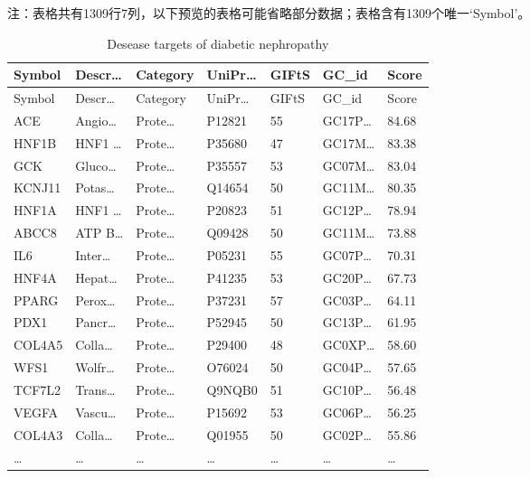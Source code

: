 \documentclass[
]{article}
\begin{document}
\begin{center}\begin{tcolorbox}[colback=gray!10, colframe=gray!50, width=0.9\linewidth, arc=1mm, boxrule=0.5pt]注：表格共有1309行7列，以下预览的表格可能省略部分数据；表格含有1309个唯一`Symbol'。
\end{tcolorbox}
\end{center}

\begin{longtable}[]{@{}lllllll@{}}
\caption{\label{tab:desease-targets-of-diabetic-nephropathy}Desease targets of diabetic nephropathy}\tabularnewline
\toprule\noalign{}
Symbol & Descr\ldots{} & Category & UniPr\ldots{} & GIFtS & GC\_id & Score \\
\midrule\noalign{}
\endfirsthead
\toprule\noalign{}
Symbol & Descr\ldots{} & Category & UniPr\ldots{} & GIFtS & GC\_id & Score \\
\midrule\noalign{}
\endhead
\bottomrule\noalign{}
\endlastfoot
ACE & Angio\ldots{} & Prote\ldots{} & P12821 & 55 & GC17P\ldots{} & 84.68 \\
HNF1B & HNF1 \ldots{} & Prote\ldots{} & P35680 & 47 & GC17M\ldots{} & 83.38 \\
GCK & Gluco\ldots{} & Prote\ldots{} & P35557 & 53 & GC07M\ldots{} & 83.04 \\
KCNJ11 & Potas\ldots{} & Prote\ldots{} & Q14654 & 50 & GC11M\ldots{} & 80.35 \\
HNF1A & HNF1 \ldots{} & Prote\ldots{} & P20823 & 51 & GC12P\ldots{} & 78.94 \\
ABCC8 & ATP B\ldots{} & Prote\ldots{} & Q09428 & 50 & GC11M\ldots{} & 73.88 \\
IL6 & Inter\ldots{} & Prote\ldots{} & P05231 & 55 & GC07P\ldots{} & 70.31 \\
HNF4A & Hepat\ldots{} & Prote\ldots{} & P41235 & 53 & GC20P\ldots{} & 67.73 \\
PPARG & Perox\ldots{} & Prote\ldots{} & P37231 & 57 & GC03P\ldots{} & 64.11 \\
PDX1 & Pancr\ldots{} & Prote\ldots{} & P52945 & 50 & GC13P\ldots{} & 61.95 \\
COL4A5 & Colla\ldots{} & Prote\ldots{} & P29400 & 48 & GC0XP\ldots{} & 58.60 \\
WFS1 & Wolfr\ldots{} & Prote\ldots{} & O76024 & 50 & GC04P\ldots{} & 57.65 \\
TCF7L2 & Trans\ldots{} & Prote\ldots{} & Q9NQB0 & 51 & GC10P\ldots{} & 56.48 \\
VEGFA & Vascu\ldots{} & Prote\ldots{} & P15692 & 53 & GC06P\ldots{} & 56.25 \\
COL4A3 & Colla\ldots{} & Prote\ldots{} & Q01955 & 50 & GC02P\ldots{} & 55.86 \\
\ldots{} & \ldots{} & \ldots{} & \ldots{} & \ldots{} & \ldots{} & \ldots{} \\
\end{longtable}
\end{document}
